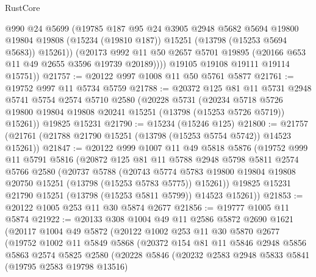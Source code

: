 \begin{lexlean}{RustCore}
\begin{coremodule}
              @990
              @24
              @5699
              (@19785
                @187
                @95
                @24
                @3905
                @2948
                @5682
                @5694
                @19800
                @19804
                @19808
                (@15234 (@19810 @187))
                @15251
                (@13798 (@15253 @5694 @5683))
                @15261))
            (@20173
              @992
              @11
              @50
              @2657
              @5701
              @19895
              (@20166 @653 @11 @49 @2655 @3596 @19739 @20189))))
        @19105
        @19108
        @19111
        @19114
        @15751))
@21757 := @20122 @997 @1008 @11 @50 @5761 @5877
@21761 := @19752 @997 @11 @5734 @5759
@21788 := @20372
    @125
    @81
    @11
    @5731
    @2948
    @5741
    @5754
    @2574
    @5710
    @2580
    (@20228
      @5731
      (@20234 @5718 @5726 @19800 @19804 @19808 @20241 @15251 (@13798 (@15253 @5726 @5719)) @15261))
    @19825
    @15231
@21790 := @15234 (@15246 @125)
@21800 := @21757 (@21761 (@21788 @21790 @15251 (@13798 (@15253 @5754 @5742)) @14523 @15261))
@21847 := @20122
    @999
    @1007
    @11
    @49
    @5818
    @5876
    (@19752
      @999
      @11
      @5791
      @5816
      (@20872
        @125
        @81
        @11
        @5788
        @2948
        @5798
        @5811
        @2574
        @5766
        @2580
        (@20737
          @5788
          (@20743
            @5774
            @5783
            @19800
            @19804
            @19808
            @20750
            @15251
            (@13798 (@15253 @5783 @5775))
            @15261))
        @19825
        @15231
        @21790
        @15251
        (@13798 (@15253 @5811 @5799))
        @14523
        @15261))
@21853 := @20122 @1005 @253 @11 @30 @5874 @2677
@21856 := @19777 @1005 @11 @5874
@21922 := @20133
    @308
    @1004
    @49
    @11
    @2586
    @5872
    @2690
    @1621
    (@20117
      @1004
      @49
      @5872
      (@20122
        @1002
        @253
        @11
        @30
        @5870
        @2677
        (@19752
          @1002
          @11
          @5849
          @5868
          (@20372
            @154
            @81
            @11
            @5846
            @2948
            @5856
            @5863
            @2574
            @5825
            @2580
            (@20228
              @5846
              (@20232
                @2583
                @2948
                @5833
                @5841
                (@19795 @2583 @19798 @13516)

\end{coremodule}
\end{lexlean}
